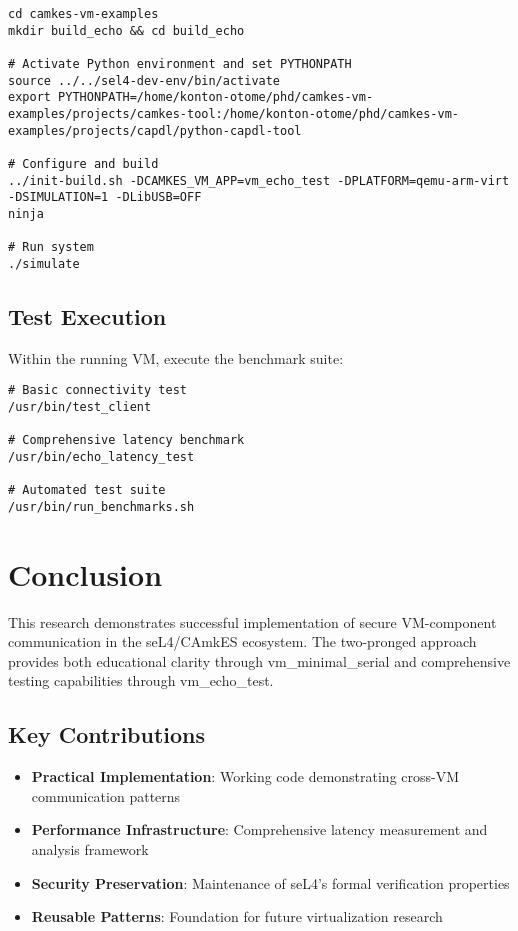 \documentclass[12pt,a4paper]{article}
\begin{document}
\begin{lstlisting}[style=bash, caption=Complete build sequence]
cd camkes-vm-examples
mkdir build_echo && cd build_echo

# Activate Python environment and set PYTHONPATH
source ../../sel4-dev-env/bin/activate
export PYTHONPATH=/home/konton-otome/phd/camkes-vm-examples/projects/camkes-tool:/home/konton-otome/phd/camkes-vm-examples/projects/capdl/python-capdl-tool

# Configure and build
../init-build.sh -DCAMKES_VM_APP=vm_echo_test -DPLATFORM=qemu-arm-virt -DSIMULATION=1 -DLibUSB=OFF
ninja

# Run system
./simulate
\end{lstlisting}

\subsection{Test Execution}

Within the running VM, execute the benchmark suite:

\begin{lstlisting}[style=bash, caption=Benchmark execution]
# Basic connectivity test
/usr/bin/test_client

# Comprehensive latency benchmark
/usr/bin/echo_latency_test

# Automated test suite
/usr/bin/run_benchmarks.sh
\end{lstlisting}

\section{Conclusion}

This research demonstrates successful implementation of secure VM-component communication in the seL4/CAmkES ecosystem. The two-pronged approach provides both educational clarity through vm\_minimal\_serial and comprehensive testing capabilities through vm\_echo\_test.

\subsection{Key Contributions}

\begin{itemize}
\item \textbf{Practical Implementation}: Working code demonstrating cross-VM communication patterns
\item \textbf{Performance Infrastructure}: Comprehensive latency measurement and analysis framework
\item \textbf{Security Preservation}: Maintenance of seL4's formal verification properties
\item \textbf{Reusable Patterns}: Foundation for future virtualization research
\end{itemize}
\end{document}
